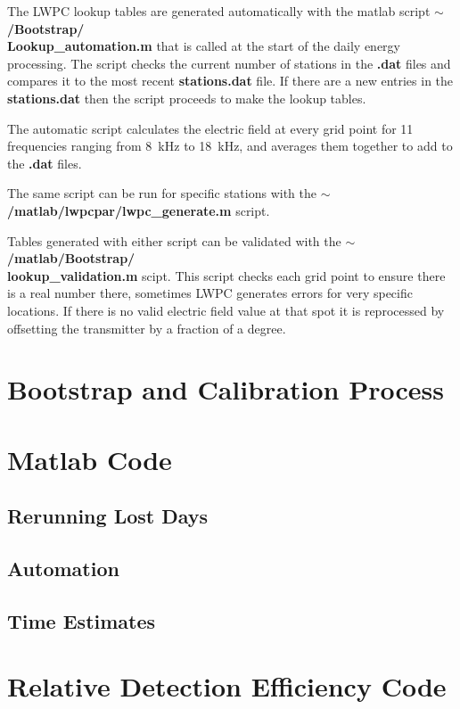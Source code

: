 The LWPC lookup tables are generated automatically with the matlab script {\bf $\sim$/Bootstrap/\\Lookup\_automation.m} that is called at the start of the daily energy processing.
The script checks the current number of stations in the \textbf{.dat} files and compares it to the most recent \textbf{stations.dat} file.
If there are a new entries in the \textbf{stations.dat} then the script proceeds to make the lookup tables.

The automatic script calculates the electric field at every grid point for 11 frequencies ranging from 8~kHz to 18~kHz, and averages them together to add to the \textbf{.dat} files.

The same script can be run for specific stations with the \textbf{$\sim$/matlab/lwpcpar/lwpc\_generate.m} script.

Tables generated with either script can be validated with the \textbf{$\sim$/matlab/Bootstrap/\\lookup\_validation.m} scipt.
This script checks each grid point to ensure there is a real number there, sometimes LWPC generates errors for very specific locations.
If there is no valid electric field value at that spot it is reprocessed by offsetting the transmitter by a fraction of a degree.

\section{Bootstrap and Calibration Process}

\section{Matlab Code}

\subsection{Rerunning Lost Days}

\subsection{Automation}

\subsection{Time Estimates}

\section{Relative Detection Efficiency Code}

